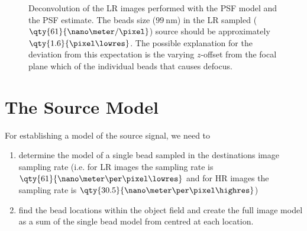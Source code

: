 \pagebreak
\begin{marginfigure}[*+15]
    \caption{%
        The \ac{PSF} estimate versus the model. 
        The model is clearly wider, which implies that the diffraction-resolution was overestimated by the model which
            is in line with the reconstruction flaws we discussed in .
    }
\end{marginfigure}


\begin{figure}[h]
    \caption{%
        Deconvolution of the \ac{LR} images performed with the \ac{PSF} model and the \ac{PSF} estimate.
        The beads size (\(\qty{99}{\nano\meter}\)) in the \ac{LR} sampled (\(\qty{61}{\nano\meter/\pixel}\)) source 
            should be approximately \(\qty{1.6}{\pixel\lowres}\).
        The possible explanation for the deviation from this expectation is the varying \(z\)-offset from the focal plane 
            which of the individual beads that causes defocus.
    }
\end{figure}




\section{The Source Model}

For establishing a model of the source signal, we need to
\begin{enumerate}[label=\roman*.]
    \item {} determine the model of a single bead sampled in the destinations image sampling rate (i.e. for
        \ac{LR} images the sampling rate is \(\qty{61}{\nano\meter\per\pixel\lowres}\) and for \ac{HR} images the
        sampling rate is \(\qty{30.5}{\nano\meter\per\pixel\highres}\))
    \item {} find the bead locations within the object field and create the full image model as
        a sum of the single bead model from  centred at each location.
\end{enumerate}

